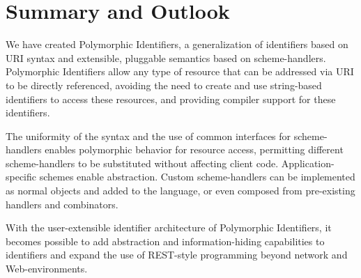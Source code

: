 \documentclass[preprint]{sigplanconf}
\begin{document}

\section{Summary and Outlook}
\label{summary-and-outlook}

We have created Polymorphic Identifiers, a generalization of identifiers based on URI
syntax and extensible, pluggable semantics based on scheme-handlers.   
Polymorphic Identifiers allow any type of resource that can be addressed via URI
to be directly referenced, avoiding the need to create and use string-based identifiers 
to access these resources, and providing compiler support for these identifiers.

The uniformity of the syntax and the use of common interfaces for scheme-handlers
enables polymorphic behavior for resource access, permitting different scheme-handlers
to be substituted without affecting client code. Application-specific schemes
enable abstraction.
Custom scheme-handlers can be implemented as normal objects and added
to the language, or even composed from pre-existing handlers and
combinators.

With the user-extensible identifier architecture of Polymorphic Identifiers, it becomes possible to add abstraction
and information-hiding capabilities to identifiers and expand the use of REST-style
programming beyond network and Web-environments.











\vfill
\break






\balancecolumns
\end{document}
